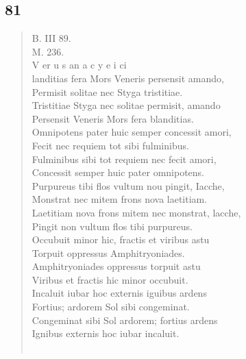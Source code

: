 \documentclass[11pt, a4paper]{report}
\begin{document}
            \subsection*{81}
      \begin{verse}
      B. III 89. \\ M. 236. \\ V er u s an a c y e i ci \\ landitias fera Mors Veneris persensit amando, \\ Permisit solitae nec Styga tristitiae. \\ Tristitiae Styga nec solitae permisit, amando \\ Persensit Veneris Mors fera blanditias. \\ Omnipotens pater huic semper concessit amori, \\ Fecit nec requiem tot sibi fulminibus. \\ Fulminibus sibi tot requiem nec fecit amori, \\ Concessit semper huic pater omnipotens. \\ Purpureus tibi flos vultum nou pingit, Iacche, \\ Monstrat nec mitem frons nova laetitiam. \\ Laetitiam nova frons mitem nec monstrat, lacche, \\ Pingit non vultum flos tibi purpureus. \\ Occubuit minor hic, fractis et viribus astu \\ Torpuit oppressus Amphitryoniades. \\ Amphitryoniades oppressus torpuit astu \\ Viribus et fractis hic minor occubuit. \\ Incaluit iubar hoc externis iguibus ardens \\ Fortius; ardorem Sol sibi congeminat. \\ Congeminat sibi Sol ardorem; fortius ardens \\ Ignibus externis hoc iubar incaluit. \\ 
        ﻿\pagebreak 

\end{verse}
\end{document}
